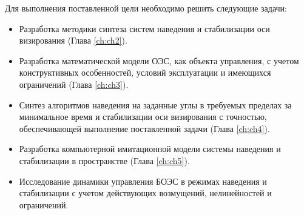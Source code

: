 Для выполнения поставленной цели необходимо решить следующие задачи:

\begin{itemize}
	\item Разработка методики синтеза систем наведения и стабилизации оси визирования (Глава \ref{ch:ch2}).
	\item Разработка математической модели ОЭС, как объекта управления, с учетом конструктивных особенностей, условий эксплуатации и имеющихся ограничений (Глава \ref{ch:ch3}).
	\item Синтез алгоритмов наведения на заданные углы в требуемых пределах за минимальное время и стабилизации оси визирования с точностью, обеспечивающей выполнение поставленной задачи (Глава \ref{ch:ch4}).
	\item Разработка компьютерной имитационной модели системы наведения и стабилизации в пространстве (Глава \ref{ch:ch5}).
	\item Исследование динамики управления БОЭС в режимах наведения и стабилизации с учетом действующих возмущений, нелинейностей и ограничений.
\end{itemize}

\clearpage